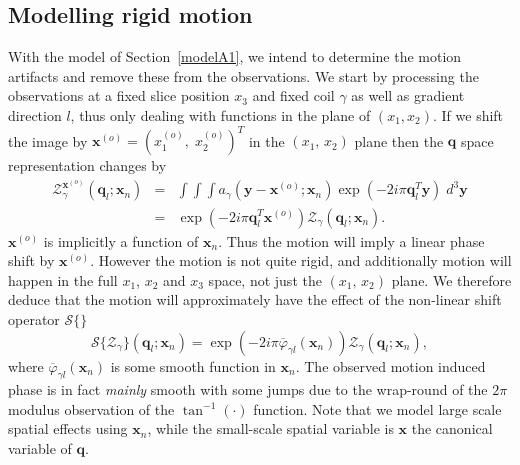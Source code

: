 \documentclass[authoryear,preprint,12pt]{elsarticle}
\newcommand{\q}{\mathbf{q}}
\newcommand{\x}{\mathbf{x}}
\newcommand{\y}{\mathbf{y}}
\newcommand{\cA}{\mathcal{A}}
\newcommand{\cS}{\mathcal{S}}
\newcommand{\cZ}{\mathcal{Z}}
\newcommand{\bld}[1]{\mathbf{#1}}
\newcommand{\bs}[1]{\boldsymbol{#1}}
\newcommand{\ol}[1]{\overline{#1}}
\begin{document}

\subsection{Modelling rigid motion}
\label{model_rigid}

With the model of Section~\ref{modelA1}, we intend to determine the
motion artifacts and remove these from the observations.  We start by
processing the observations at a fixed slice position $x_3$ and fixed
coil $\gamma$ as well as gradient direction $l$, thus only dealing
with functions in the plane of $(x_1,x_2)$.  If we shift the image by
$\x^{(o)}=(x_1^{(o)},\;x_2^{(o)})^T$ in the $(x_1,\,x_2)$ plane then
the $\q$ space representation changes by
\begin{eqnarray}
  \cZ^{\x^{(o)}}_{\gamma}(\q_l;\x_n) &=& \int\int\int
  a_{\gamma}\left(\y-\x^{(o)};\x_n\right) \exp\left(-2i\pi
  \q_l^T\y\right) \; d^3\y \nonumber\\ 
  &=& \exp\left(-2i\pi \q_l^T \x^{(o)}\right)\cZ_{\gamma}(\q_l;\x_n).
\end{eqnarray}
$\x^{(o)}$ is implicitly a function of $\x_n$.  Thus the motion will
imply a linear phase shift by $\x^{(o)}$.  However the motion is not
quite rigid, and additionally motion will happen in the full $x_1$,
$x_2$ and $x_3$ space, not just the $(x_1,\,x_2)$ plane.  We therefore
deduce that the motion will approximately have the effect of the
non-linear shift operator $\cS\{ \}$ \citep{Olhede2008}
\begin{equation}\label{eq:motion_phase}
  \cS\{\cZ_{\gamma}\}(\q_l;\x_n) = \exp\left(-2i\pi
  \ol{\varphi}_{\gamma l}(\x_n)\right)\cZ_{\gamma}(\q_l;\x_n),
\end{equation}
where $\ol{\varphi}_{\gamma l}(\x_n)$ is some smooth function in
$\x_n$.  The observed motion induced phase is in fact \textit{mainly}
smooth with some jumps due to the wrap-round of the $2\pi$ modulus
observation of the $\tan^{-1}(\cdot)$ function.  Note that we model
large scale spatial effects using $\x_n$, while the small-scale
spatial variable is $\x$ the canonical variable of $\q$.
\end{document}
